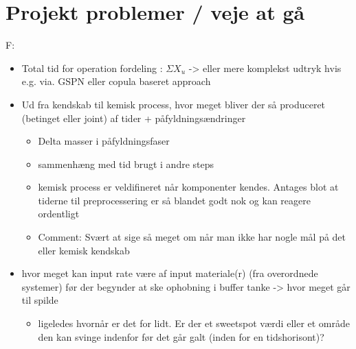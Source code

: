 \documentclass[../Thesis.tex]{subfiles}
\begin{document}
\chapter{Projekt problemer / veje at gå}

F:
\begin{itemize}
    \item Total tid for operation fordeling : $\Sigma X_u$ -> eller mere komplekst udtryk hvis e.g. via. GSPN eller copula baseret approach
    \item Ud fra kendskab til kemisk process, hvor meget bliver der så produceret (betinget eller joint) af tider + påfyldningsændringer
          \begin{itemize}
              \item Delta masser i påfyldningsfaser
              \item sammenhæng med tid brugt i andre steps
              \item kemisk process er veldifineret når komponenter kendes. Antages blot at tiderne til preprocessering er så blandet godt nok og kan reagere ordentligt
              \item Comment: Svært at sige så meget om når man ikke har nogle mål på det eller kemisk kendskab
          \end{itemize}
    \item hvor meget kan input rate være af input materiale(r) (fra overordnede systemer) før der begynder at ske ophobning i buffer tanke -> hvor meget går til spilde
          \begin{itemize}
              \item ligeledes hvornår er det for lidt. Er der et sweetspot værdi eller et område den kan svinge indenfor før det går galt (inden for en tidshorisont)?
          \end{itemize}
\end{itemize}
\end{document}
